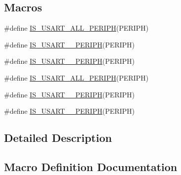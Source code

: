 \subsection*{Macros}
\begin{DoxyCompactItemize}
\item 
\#define \hyperlink{group___u_s_a_r_t___exported___constants_gae890b8e77c1b84a77c485a353949f7eb}{I\+S\+\_\+\+U\+S\+A\+R\+T\+\_\+\+A\+L\+L\+\_\+\+P\+E\+R\+I\+PH}(P\+E\+R\+I\+PH)
\item 
\#define \hyperlink{group___u_s_a_r_t___exported___constants_ga30e128c5edde23e1315724c0b2000d0d}{I\+S\+\_\+\+U\+S\+A\+R\+T\+\_\+\_\+\+P\+E\+R\+I\+PH}(P\+E\+R\+I\+PH)
\item 
\#define \hyperlink{group___u_s_a_r_t___exported___constants_ga9b6af380cae2290d0653bd555deaeda1}{I\+S\+\_\+\+U\+S\+A\+R\+T\+\_\+\_\+\+P\+E\+R\+I\+PH}(P\+E\+R\+I\+PH)
\item 
\#define \hyperlink{group___u_s_a_r_t___exported___constants_gae890b8e77c1b84a77c485a353949f7eb}{I\+S\+\_\+\+U\+S\+A\+R\+T\+\_\+\+A\+L\+L\+\_\+\+P\+E\+R\+I\+PH}(P\+E\+R\+I\+PH)
\item 
\#define \hyperlink{group___u_s_a_r_t___exported___constants_ga30e128c5edde23e1315724c0b2000d0d}{I\+S\+\_\+\+U\+S\+A\+R\+T\+\_\+\_\+\+P\+E\+R\+I\+PH}(P\+E\+R\+I\+PH)
\item 
\#define \hyperlink{group___u_s_a_r_t___exported___constants_ga9b6af380cae2290d0653bd555deaeda1}{I\+S\+\_\+\+U\+S\+A\+R\+T\+\_\+\_\+\+P\+E\+R\+I\+PH}(P\+E\+R\+I\+PH)
\end{DoxyCompactItemize}


\subsection{Detailed Description}


\subsection{Macro Definition Documentation}
